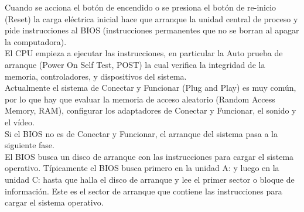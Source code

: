\documentclass[12pt,oneside,a4paper]{article}
\begin{document}
	Cuando se acciona el botón de encendido o se presiona el botón de re-inicio
	(Reset) la carga eléctrica inicial hace que arranque la unidad central de
	proceso y pide instrucciones al BIOS (instrucciones permanentes que no se
	borran al apagar la computadora). 
	\\ 
	El CPU empieza a ejecutar las instrucciones, en particular la Auto prueba
	de arranque (Power On Self Test, POST) la cual verifica la integridad de la
	memoria, controladores, y dispositivos del sistema. 
	\\ 
	Actualmente el sistema de Conectar y Funcionar (Plug and Play) es muy
	común, por lo que hay que evaluar la memoria de acceso aleatorio (Random
	Access Memory, RAM), configurar los adaptadores de Conectar y Funcionar, el 
	sonido y el vídeo. 
	\\ 
	Si el BIOS no es de Conectar y Funcionar, el arranque del sistema pasa a la
	siguiente fase. 
	\\ 
	El BIOS busca un disco de arranque con las instrucciones para cargar el
	sistema operativo.  Típicamente el BIOS busca primero en la unidad A: y
	luego en la unidad C: hasta que halla el disco de arranque y lee el primer
	sector o bloque de información. Este es el sector de arranque que contiene
	las instrucciones para cargar el sistema operativo.



			
\end{document}
